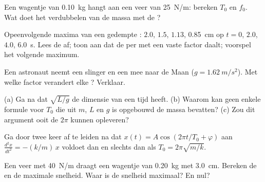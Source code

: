 \begin{exercise}[$\star$]\label{exo:g12:oscillators-and-time:3}
Een wagentje van \qty{0.10}{kg} hangt aan een veer van \qty{25}{N/m}: bereken
$T_0$ en $f_0$. Wat doet het verdubbelen van de massa met de ?
\end{exercise}

\begin{exercise}[$\star$]\label{exo:g12:oscillators-and-time:4}
Opeenvolgende maxima van een gedempte : $2.0$, $1.5$, $1.13$,
\qty{0.85}{cm} op $t = 0$, $2.0$, $4.0$, \qty{6.0}{s}. Lees de 
af; toon aan dat de  per  met een vaste factor daalt;
voorspel het volgende maximum.
\end{exercise}

\begin{exercise}[$\star$]\label{exo:g12:oscillators-and-time:5}
Een astronaut neemt een slinger en een  mee naar de Maan
($g = \qty{1.62}{m/s^2}$). Met welke factor verandert elke ? Verklaar.
\end{exercise}

\begin{exercise}[$\star\star$]\label{exo:g12:oscillators-and-time:6}
(a) Ga na dat $\sqrt{L/g}$ de dimensie van een tijd heeft. (b) Waarom kan
geen enkele formule voor $T_0$ die uit $m$, $L$ en $g$ is opgebouwd de massa
bevatten? (c) Zou dit argument ooit de $2\pi$ kunnen opleveren?
\end{exercise}

\begin{exercise}[$\star\star$]\label{exo:g12:oscillators-and-time:7}
Ga door twee keer af te leiden na dat $x(t) = A\cos(2\pi t/T_0 + \varphi)$
aan $\frac{d^2x}{dt^2} = -(k/m)\,x$ voldoet dan en slechts dan als
$T_0 = 2\pi\sqrt{m/k}$.
\end{exercise}

\begin{exercise}[$\star\star$]\label{exo:g12:oscillators-and-time:8}
Een veer met  \qty{40}{N/m} draagt een wagentje van
\qty{0.20}{kg} met  \qty{3.0}{cm}. Bereken de  en
de maximale snelheid. Waar is de snelheid maximaal? En nul?
\end{exercise}

